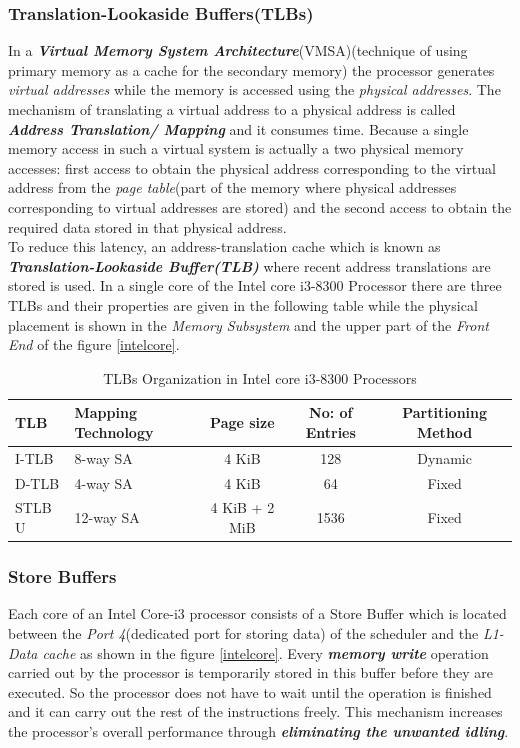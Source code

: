 \documentclass[a4paper,11pt]{article}
\begin{document}
\subsubsection{Translation-Lookaside Buffers(TLBs)}
In a \textit{\textbf{Virtual Memory System Architecture}}(VMSA)(technique of using primary memory as a cache for the secondary memory) the processor generates \textit{virtual addresses} while the memory is accessed using the \textit{physical addresses}. The mechanism of translating a virtual address to a physical address is called \textbf{\textit{Address Translation/ Mapping}} and it consumes time. Because a single memory access in such a virtual system is actually a two physical memory accesses: first access to obtain the physical address corresponding to the virtual address from the \textit{page table}(part of the memory where physical addresses corresponding to virtual addresses are stored) and the second access to obtain the required data stored in that physical address.\\

To reduce this latency, an address-translation cache which is known as \textbf{\textit{Translation-Lookaside Buffer(TLB)}} where recent address translations are stored is used. In a single core of the Intel core i3-8300 Processor there are three TLBs and their properties are given in the following table while the physical placement is shown in the \textit{Memory Subsystem} and the upper part of the \textit{Front End} of the figure \ref{intelcore}.


\begin{table}[!h]
	\centering
	\begin{tabular}{l |l| c| c| c}
		TLB  & Mapping Technology & Page size & No: of Entries& Partitioning Method\\
		\hline
		I-TLB & 8-way SA & 4 KiB& 128 &Dynamic\\
		D-TLB &  4-way SA & 4 KiB &64 &Fixed\\
		STLB U & 12-way SA&  4 KiB + 2 MiB & 1536 & Fixed\\
		\hline\hline
	\end{tabular}
	\caption{TLBs Organization in Intel core i3-8300 Processors}
\end{table}


\subsubsection{Store Buffers}

Each core of an Intel Core-i3 processor consists of a Store Buffer which is located between the \textit{Port 4}(dedicated port for storing data) of the scheduler and the \textit{L1-Data cache} as shown in the figure \ref{intelcore}. Every \textbf{\textit{memory write}} operation carried out by the processor is temporarily stored in this buffer before they are executed. So the processor does not have to wait until the operation is finished and it can carry out the rest of the instructions freely. This mechanism increases the processor's overall performance through \textit{\textbf{eliminating the unwanted idling}}. 
\end{document}
